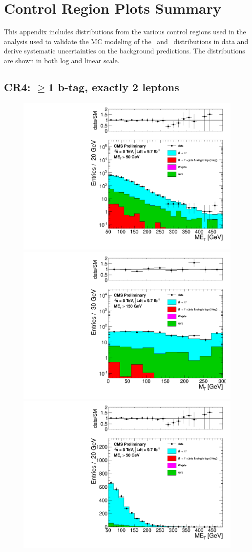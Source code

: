 \section{Control Region Plots Summary}
\label{sec:controlRegions}

This appendix includes distributions from the various control regions
used in the analysis used to validate the MC modeling of the \met\ and
\mt\ distributions in data and derive systematic uncertainties on the
background predictions. The distributions are shown in both log and
linear scale. 

 \subsection {CR4: $\ge$1 b-tag, exactly 2 leptons}

\begin{figure}[hbt]\begin{center}       
\includegraphics[width=0.5\linewidth]{plots/pas_log/met_met50_nj4_emucomb_CR4.pdf}%
\includegraphics[width=0.5\linewidth]{plots/pas_log/mt_met150_nj4_emucomb_CR4.pdf}    
\includegraphics[width=0.5\linewidth]{plots/pas_lin/met_met50_nj4_emucomb_CR4.pdf}%

\end{center}
\end{figure}
